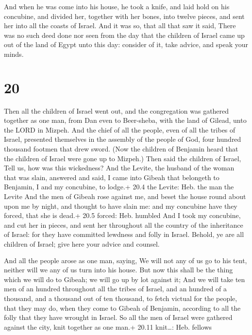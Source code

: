  And when he was come into his house, he took a knife,
and laid hold on his concubine, and divided her, together with her
bones, into twelve pieces, and sent her into all the coasts of Israel.
 And it was so, that all that saw it said, There was no
such deed done nor seen from the day that the children of Israel came up
out of the land of Egypt unto this day: consider of it, take advice, and
speak your minds.

\hypertarget{section-19}{%
\section{20}\label{section-19}}

 Then all the children of Israel went out, and the
congregation was gathered together as one man, from Dan even to
Beer-sheba, with the land of Gilead, unto the LORD in Mizpeh.
 And the chief of all the people, even of all the tribes of
Israel, presented themselves in the assembly of the people of God, four
hundred thousand footmen that drew sword.  (Now the children
of Benjamin heard that the children of Israel were gone up to Mizpeh.)
Then said the children of Israel, Tell us, how was this wickedness?
 And the Levite, the husband of the woman that was slain,
answered and said, I came into Gibeah that belongeth to Benjamin, I and
my concubine, to lodge.+ 20.4 the Levite: Heb. the man the Levite
 And the men of Gibeah rose against me, and beset the house
round about upon me by night, and thought to have slain me: and my
concubine have they forced, that she is dead.+ 20.5 forced: Heb. humbled
 And I took my concubine, and cut her in pieces, and sent
her throughout all the country of the inheritance of Israel: for they
have committed lewdness and folly in Israel.  Behold, ye are
all children of Israel; give here your advice and counsel.

 And all the people arose as one man, saying, We will not
any of us go to his tent, neither will we any of us turn into his house.
 But now this shall be the thing which we will do to Gibeah;
we will go up by lot against it;  And we will take ten men
of an hundred throughout all the tribes of Israel, and an hundred of a
thousand, and a thousand out of ten thousand, to fetch victual for the
people, that they may do, when they come to Gibeah of Benjamin,
according to all the folly that they have wrought in Israel.
 So all the men of Israel were gathered against the city,
knit together as one man.+ 20.11 knit\ldots: Heb. fellows

